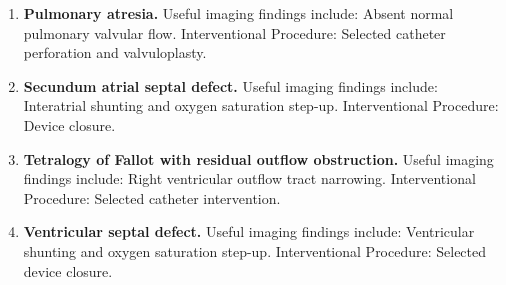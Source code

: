 \begin{enumerate}[leftmargin=*,itemsep=0.45em,topsep=0.4em]
\item \textbf{Pulmonary atresia.} Useful imaging findings include: Absent normal pulmonary valvular flow. Interventional Procedure: Selected catheter perforation and valvuloplasty.
\item \textbf{Secundum atrial septal defect.} Useful imaging findings include: Interatrial shunting and oxygen saturation step-up. Interventional Procedure: Device closure.
\item \textbf{Tetralogy of Fallot with residual outflow obstruction.} Useful imaging findings include: Right ventricular outflow tract narrowing. Interventional Procedure: Selected catheter intervention.
\item \textbf{Ventricular septal defect.} Useful imaging findings include: Ventricular shunting and oxygen saturation step-up. Interventional Procedure: Selected device closure.
\end{enumerate}

